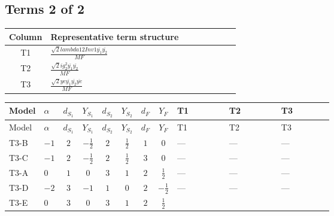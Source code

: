 \documentclass[8pt]{article}
\begin{document}
\begin{landscape}
\subsection*{Terms 2 of 2}
\begin{center}
\begin{tabular}{@{}c >{\raggedright\arraybackslash}p{0.82\linewidth}@{}}
\toprule
Column & Representative term structure \\
\midrule
T1 & \(\displaystyle \frac{\sqrt{2} lambda12Inv1 \overline{y_{1}} \overline{y_{2}}}{MF}\) \\
\midrule
T2 & \(\displaystyle \frac{\sqrt{2} i g_{2}^{2} \overline{y_{1}} \overline{y_{2}}}{MF}\) \\
\midrule
T3 & \(\displaystyle \frac{\sqrt{2} ye \overline{y_{1}} \overline{y_{2}} \overline{ye}}{MF}\) \\
\midrule
\bottomrule
\end{tabular}
\end{center}
\smallskip
\tiny
\begin{longtable}{@{}llcccccc >{\raggedright\arraybackslash}p{0.21\linewidth} >{\raggedright\arraybackslash}p{0.21\linewidth} >{\raggedright\arraybackslash}p{0.21\linewidth}@{}}
\toprule
Model & $\alpha$ & $d_{S_1}$ & $Y_{S_1}$ & $d_{S_2}$ & $Y_{S_2}$ & $d_F$ & $Y_F$ & T1 & T2 & T3 \\
\midrule
\endfirsthead
\toprule
Model & $\alpha$ & $d_{S_1}$ & $Y_{S_1}$ & $d_{S_2}$ & $Y_{S_2}$ & $d_F$ & $Y_F$ & T1 & T2 & T3 \\
\midrule
\endhead
T3-B & $-1$ & $2$ & $-\frac{1}{2}$ & $2$ & $\frac{1}{2}$ & $1$ & $0$ & --- & --- & --- \\
\midrule
T3-C & $-1$ & $2$ & $-\frac{1}{2}$ & $2$ & $\frac{1}{2}$ & $3$ & $0$ & --- & --- & --- \\
\midrule
T3-A & $0$ & $1$ & $0$ & $3$ & $1$ & $2$ & $\frac{1}{2}$ & --- & --- & --- \\
\midrule
T3-D & $-2$ & $3$ & $-1$ & $1$ & $0$ & $2$ & $-\frac{1}{2}$ & --- & --- & --- \\
\midrule
T3-E & $0$ & $3$ & $0$ & $3$ & $1$ & $2$ & $\frac{1}{2}$ & \scriptsize\adjustbox{max width=\linewidth}{$\begin{gathered} \frac{\sqrt{2} lambda12Inv1 \overline{y_{1}} \overline{y_{2}}}{4 MF}\end{gathered}$} & \scriptsize\adjustbox{max width=\linewidth}{$\begin{gathered} - \frac{\sqrt{2} i g_{2}^{2} \overline{y_{1}} \overline{y_{2}}}{4 MF}\end{gathered}$} & \scriptsize\adjustbox{max width=\linewidth}{$\begin{gathered} \frac{\sqrt{2} ye \overline{y_{1}} \overline{y_{2}} \overline{ye}}{8 MF}\end{gathered}$} \\
\midrule
\bottomrule
\end{longtable}
\clearpage

\end{landscape}
\end{document}
